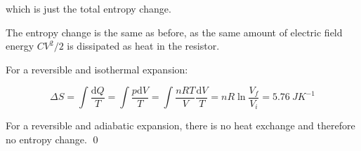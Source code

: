 \documentclass[12pt]{article}
\begin{document}
which is just the total entropy change.

The entropy change is the same as before, as the same amount of electric field energy $CV^{2}/2$ is dissipated as heat in the resistor.

For a reversible and isothermal expansion:

\begin{equation}
    \Delta S = \int \frac{\mathrm{d}Q}{T} = \int \frac{p \mathrm{d}V}{T} = \int \frac{nRT}{V} \frac{\mathrm{d}V}{T} = nR \ln{\frac{V_{f}}{V_{i}}} = \qty{5.76}{JK^{-1}}
\end{equation}

For a reversible and adiabatic expansion, there is no heat exchange and therefore no entropy change.
\qed
\end{document}
